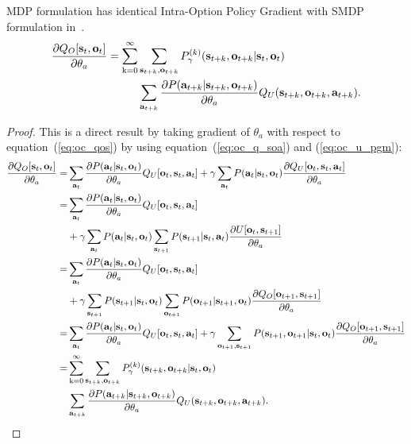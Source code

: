 \begin{prop}
  \label{approp:oc_a_grad}
  MDP formulation has identical Intra-Option Policy Gradient with
  SMDP formulation in~\cite{bacon2017option}.
  \begin{align}
    \nonumber    \frac{\partial Q_O[ {\mathbf{s}}_t,{\mathbf{o}}_t ]}{\partial \theta_a}=
    \sum_{{\textnormal{k}}=0}^\infty&\sum_{{\mathbf{s}}_{t+k},{\mathbf{o}}_{t+k}}P_\gamma^{(k)}({\mathbf{s}}_{t+k},{\mathbf{o}}_{t+k}|{\mathbf{s}}_t,{\mathbf{o}}_t)\\
    \label{eq:oc_a_grad}    &\sum_{{\mathbf{a}}_{t+k}}\frac{\partial P({\mathbf{a}}_{t+k}|{\mathbf{s}}_{t+k},{\mathbf{o}}_{t+k})}{\partial \theta_a}Q_U({\mathbf{s}}_{t+k},{\mathbf{o}}_{t+k},{\mathbf{a}}_{t+k}).
  \end{align}
\end{prop}

\begin{proof}
  This is a direct result by taking gradient of $\theta_a$ with
  respect to equation~(\ref{eq:oc_qos}) by using
  equation~(\ref{eq:oc_q_soa}) and (\ref{eq:oc_u_pgm}):
\begin{align*}
  \frac{\partial Q_O[ {\mathbf{s}}_t,{\mathbf{o}}_t ]}{\partial \theta_a}=&\sum_{{\mathbf{a}}_t}\frac{\partial P({\mathbf{a}}_t|{\mathbf{s}}_t,{\mathbf{o}}_t)}{\partial \theta_a}Q_U[{\mathbf{o}}_t, {\mathbf{s}}_t,{\mathbf{a}}_t]+\gamma\sum_{{\mathbf{a}}_t}P({\mathbf{a}}_t|{\mathbf{s}}_t,{\mathbf{o}}_t)\frac{\partial Q_U[{\mathbf{o}}_t, {\mathbf{s}}_t,{\mathbf{a}}_t]}{\partial \theta_a}\\
  =&\sum_{{\mathbf{a}}_t}\frac{\partial P({\mathbf{a}}_t|{\mathbf{s}}_t,{\mathbf{o}}_t)}{\partial \theta_a}Q_U[{\mathbf{o}}_t, {\mathbf{s}}_t,{\mathbf{a}}_t]\\
                                                        &+ \gamma\sum_{{\mathbf{a}}_t}P({\mathbf{a}}_t|{\mathbf{s}}_t,{\mathbf{o}}_t)\sum_{{\mathbf{s}}_{t+1}}P({\mathbf{s}}_{t+1}|{\mathbf{s}}_t,{\mathbf{a}}_t)\frac{\partial U[{\mathbf{o}}_t,{\mathbf{s}}_{t+1}]}{\partial \theta_a}\\
  =&\sum_{{\mathbf{a}}_t}\frac{\partial P({\mathbf{a}}_t|{\mathbf{s}}_t,{\mathbf{o}}_t)}{\partial \theta_a}Q_U[{\mathbf{o}}_t, {\mathbf{s}}_t,{\mathbf{a}}_t]\\
                                                        &+ \gamma\sum_{{\mathbf{s}}_{t+1}}P({\mathbf{s}}_{t+1}|{\mathbf{s}}_t,{\mathbf{o}}_t)\sum_{{\mathbf{o}}_{t+1}}P({\mathbf{o}}_{t+1}|{\mathbf{s}}_{t+1},{\mathbf{o}}_t)\frac{\partial Q_O[{\mathbf{o}}_{t+1},{\mathbf{s}}_{t+1}]}{\partial \theta_a}\\
  =&\sum_{{\mathbf{a}}_t}\frac{\partial P({\mathbf{a}}_t|{\mathbf{s}}_t,{\mathbf{o}}_t)}{\partial \theta_a}Q_U[{\mathbf{o}}_t, {\mathbf{s}}_t,{\mathbf{a}}_t] + \gamma\sum_{{\mathbf{o}}_{t+1},{\mathbf{s}}_{t+1}}P({\mathbf{s}}_{t+1},{\mathbf{o}}_{t+1}|{\mathbf{s}}_{t},{\mathbf{o}}_t)\frac{\partial Q_O[{\mathbf{o}}_{t+1},{\mathbf{s}}_{t+1}]}{\partial \theta_a}\\
  =&\sum_{{\textnormal{k}}=0}^\infty\sum_{{\mathbf{s}}_{t+k},{\mathbf{o}}_{t+k}}P_\gamma^{(k)}({\mathbf{s}}_{t+k},{\mathbf{o}}_{t+k}|{\mathbf{s}}_t,{\mathbf{o}}_t)\\
                                                        &\sum_{{\mathbf{a}}_{t+k}}\frac{\partial P({\mathbf{a}}_{t+k}|{\mathbf{s}}_{t+k},{\mathbf{o}}_{t+k})}{\partial \theta_a}Q_U({\mathbf{s}}_{t+k},{\mathbf{o}}_{t+k},{\mathbf{a}}_{t+k}).
\end{align*}
\end{proof}

